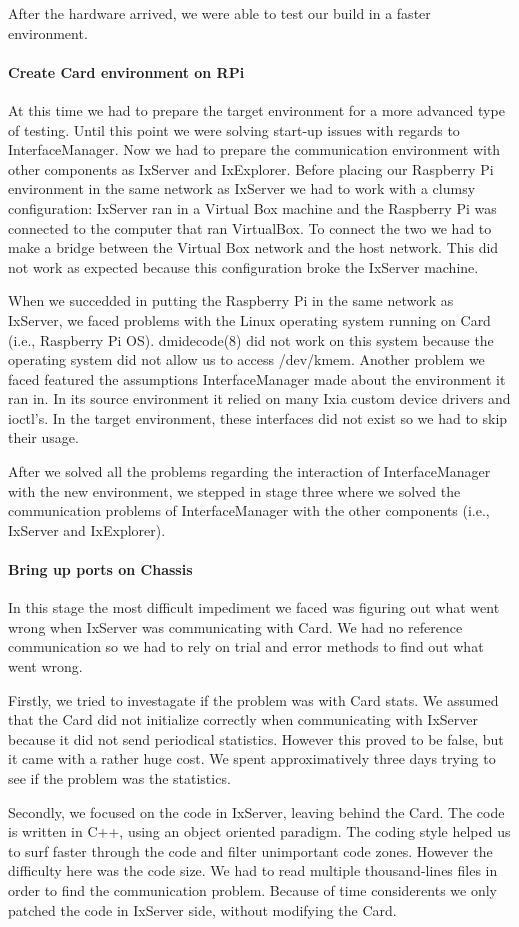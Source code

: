 After the hardware arrived, we were able to test our build in a faster
environment.

\paragraph{Create Card environment on RPi}

At this time we had to prepare the target environment for a more advanced
type of testing. Until this point we were solving start-up issues with regards
to InterfaceManager. Now we had to prepare the communication environment with
other components as IxServer and IxExplorer. Before placing our Raspberry Pi
environment in the same network as IxServer we had to work with a clumsy
configuration: IxServer ran in a Virtual Box machine and the Raspberry Pi was
connected to the computer that ran VirtualBox. To connect the two we had to make
a bridge between the Virtual Box network and the host network. This did not work
as expected because this configuration broke the IxServer machine.

When we succedded in putting the Raspberry Pi in the same network as IxServer,
we faced problems with the Linux operating system running on Card (i.e.,
Raspberry Pi OS). dmidecode(8) did not work on this system because the operating
system did not allow us to access /dev/kmem. Another problem we faced featured
the assumptions InterfaceManager made about the environment it ran in. In its
source environment it relied on many Ixia custom device drivers and ioctl's.
In the target environment, these interfaces did not exist so we had to
skip their usage.

After we solved all the problems regarding the interaction of InterfaceManager
with the new environment, we stepped in stage three where we solved the
communication problems of InterfaceManager with the other components (i.e.,
IxServer and IxExplorer).

\paragraph{Bring up ports on Chassis}

In this stage the most difficult impediment we faced was figuring out what went
wrong when IxServer was communicating with Card. We had no reference
communication so we had to rely on trial and error methods to find out what went
wrong.

Firstly, we tried to investagate if the problem was with Card stats. We assumed
that the Card did not initialize correctly when communicating with IxServer
because it did not send periodical statistics. However this proved to be false,
but it came with a rather huge cost. We spent approximatively three days trying
to see if the problem was the statistics.

Secondly, we focused on the code in IxServer, leaving behind the Card. The code
is written in C++, using an object oriented paradigm. The coding style helped us
to surf faster through the code and filter unimportant code zones. However the
difficulty here was the code size. We had to read multiple thousand-lines files
in order to find the communication problem. Because of time considerents we only
patched the code in IxServer side, without modifying the Card.
